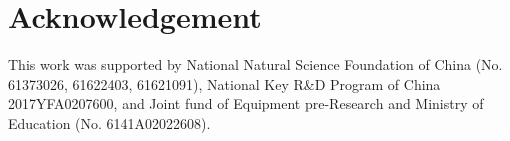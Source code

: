 \documentclass[acmsmall]{acmart}
\begin{document}
\maketitle

\renewcommand{\shortauthors}{K. Guo et al.}
\newcommand{\rev}[1]{{\color[rgb]{0,0,1}{#1}}}

















\section*{Acknowledgement}
This work was supported by National Natural Science Foundation of China (No.  61373026, 61622403, 61621091), National Key R\&D Program of China 2017YFA0207600, and Joint fund of Equipment pre-Research and Ministry of Education (No. 6141A02022608).



\end{document}
